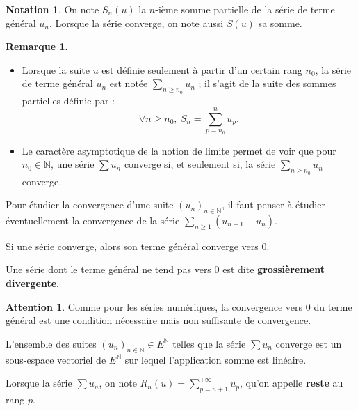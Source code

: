 \documentclass[french]{article}
\newcommand{\N}{\mathbb{N}}
\theoremstyle{plain}
\theoremstyle{definition}
\newtheorem*{rmq}{Remarque}
\newtheorem*{notation}{Notation}
\newtheorem*{attention}{Attention}
\theoremstyle{remark}
\begin{document}
\begin{notation} 
	On note $S_n(u)$ la $n$-ième somme partielle de la série de terme général $u_n$. Lorsque la série converge, on note aussi $S(u)$ sa somme.
\end{notation}

\begin{rmq}
	\begin{itemize}
		\item Lorsque la suite $u$ est définie seulement à partir d'un certain rang $n_0$, la série de terme général $u_n$ est notée $\displaystyle\sum_{n\geqslant n_0}u_n$ ; il s'agit de la suite des sommes partielles définie par : $$\forall n\geqslant n_0,\ S_n=\sum_{p=n_0}^{n}u_p.$$
		\item Le caractère asymptotique de la notion de limite permet de voir que pour $n_0\in\N$, une série $\displaystyle\sum u_n$ converge si, et seulement si, la série $\displaystyle\sum_{n\geqslant n_0}u_n$ converge.
	\end{itemize}
\end{rmq}

\begin{met}
	Pour étudier la convergence d'une suite $(u_n)_{n\in\N}$, il faut penser à étudier éventuellement la convergence de la série $\displaystyle\sum_{n\geqslant 1}(u_{n+1}-u_n)$.
\end{met}

\begin{prop}%
	Si une série converge, alors son terme général converge vers $0$.
\end{prop}

\begin{dfn}
	Une série dont le terme général ne tend pas vers $0$ est dite \textbf{grossièrement divergente}.
\end{dfn}

\begin{attention} 
Comme pour les séries numériques, la convergence vers $0$ du terme général est une condition nécessaire mais non suffisante de convergence.
\end{attention}

\begin{prop}%
	L'ensemble des suites $(u_n)_{n\in\N}\in E^\N$ telles que la série $\displaystyle\sum u_n$ converge est un sous-espace vectoriel de $E^\N$ sur lequel l'application somme est linéaire.
\end{prop}

\begin{dfn}
	Lorsque la série $\displaystyle\sum u_n$, on note $\displaystyle R_n(u)=\sum_{p=n+1}^{+\infty}u_p$, qu'on appelle \textbf{reste} au rang $p$.
\end{dfn}
\end{document}
